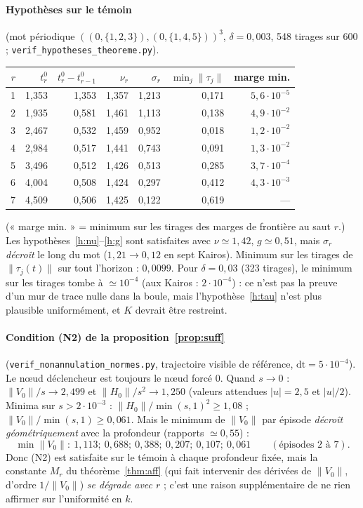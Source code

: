 \documentclass[11pt,a4paper]{article}
\theoremstyle{remark}
\theoremstyle{definition}
\newcommand{\norm}[1]{\lVert #1\rVert}
\begin{document}
\paragraph{Hypothèses sur le témoin} (mot périodique $((0,\{1,2,3\}),(0,\{1,4,5\}))^3$, $\delta=0{,}003$, 548 tirages sur 600 ; \texttt{verif\_hypotheses\_theoreme.py}).

\begin{center}
\begin{tabular}{rrrrrrr}
\toprule
$r$ & $t_r^0$ & $t_r^0-t_{r-1}^0$ & $\nu_r$ & $\sigma_r$ & $\min_j\norm{\tau_j}$ & marge min.\\
\midrule
1 & 1,353 & 1,353 & 1,357 & 1,213 & 0,171 & $5{,}6\cdot10^{-5}$\\
2 & 1,935 & 0,581 & 1,461 & 1,113 & 0,138 & $4{,}9\cdot10^{-2}$\\
3 & 2,467 & 0,532 & 1,459 & 0,952 & 0,018 & $1{,}2\cdot10^{-2}$\\
4 & 2,984 & 0,517 & 1,441 & 0,743 & 0,091 & $1{,}3\cdot10^{-2}$\\
5 & 3,496 & 0,512 & 1,426 & 0,513 & 0,285 & $3{,}7\cdot10^{-4}$\\
6 & 4,004 & 0,508 & 1,424 & 0,297 & 0,412 & $4{,}3\cdot10^{-3}$\\
7 & 4,509 & 0,506 & 1,425 & 0,122 & 0,619 & ---\\
\bottomrule
\end{tabular}
\end{center}
(« marge min. » = minimum sur les tirages des marges de frontière au saut $r$.) Les hypothèses~\ref{h:nu}--\ref{h:g} sont satisfaites avec $\nu\simeq1{,}42$, $g\simeq0{,}51$, mais $\sigma_r$ \emph{décroît} le long du mot ($1{,}21\to0{,}12$ en sept Kairos). Minimum sur les tirages de $\norm{\tau_j(t)}$ sur tout l'horizon : $0{,}0099$. Pour $\delta=0{,}03$ (323 tirages), le minimum sur les tirages tombe à $\simeq10^{-4}$ (aux Kairos : $2\cdot10^{-4}$) : ce n'est pas la preuve d'un mur de trace nulle dans la boule, mais l'hypothèse~\ref{h:tau} n'est plus plausible uniformément, et $K$ devrait être restreint.

\paragraph{Condition (N2) de la proposition~\ref{prop:suff}} (\texttt{verif\_nonannulation\_normes.py}, trajectoire visible de référence, $\mathrm{dt}=5\cdot10^{-4}$). Le n\oe ud déclencheur est toujours le n\oe ud forcé $0$. Quand $s\to0$ : $\norm{V_0}/s\to2{,}499$ et $\norm{H_0}/s^2\to1{,}250$ (valeurs attendues $|u|=2{,}5$ et $|u|/2$). Minima sur $s>2\cdot10^{-3}$ : $\norm{H_0}/\min(s,1)^2\ge1{,}08$ ; $\norm{V_0}/\min(s,1)\ge0{,}061$. Mais le minimum de $\norm{V_0}$ par épisode \emph{décroît géométriquement} avec la profondeur (rapports $\simeq0{,}55$) :
\[
\min\norm{V_0}:\ 1{,}113;\ 0{,}688;\ 0{,}388;\ 0{,}207;\ 0{,}107;\ 0{,}061\qquad(\text{épisodes }2\text{ à }7).
\]
Donc (N2) est satisfaite sur le témoin à chaque profondeur fixée, mais la constante $M_r$ du théorème~\ref{thm:aff} (qui fait intervenir des dérivées de $\norm{V_0}$, d'ordre $1/\norm{V_0}$) \emph{se dégrade avec $r$} ; c'est une raison supplémentaire de ne rien affirmer sur l'uniformité en $k$.
\end{document}
